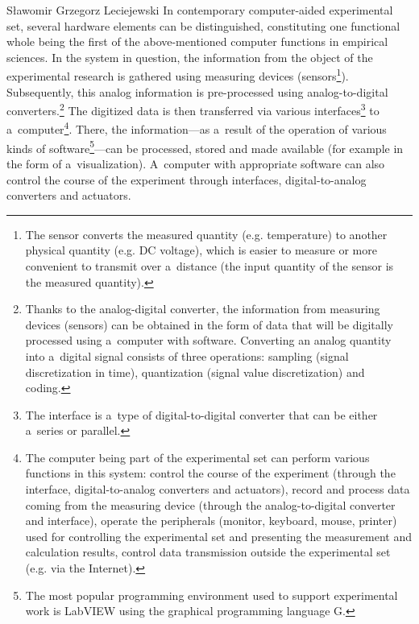 \begin{artengenv}{Sławomir Grzegorz Leciejewski}
In contemporary computer-aided experimental set, several hardware elements can be distinguished, constituting one functional whole being the first of the above-mentioned computer functions in empirical sciences. In the system in question, the information from the object of the experimental research is gathered using measuring devices (sensors\footnote{The sensor converts the measured quantity (e.g. temperature) to another physical quantity (e.g. DC voltage), which is easier to measure or more convenient to transmit over a~distance (the input quantity of the sensor is the measured quantity).}). Subsequently, this analog information is pre-processed using analog-to-digital converters.\footnote{Thanks to the analog-digital converter, the information from measuring devices (sensors) can be obtained in the form of data that will be digitally processed using a~computer with software. Converting an analog quantity into a~digital signal consists of three operations: sampling (signal discretization in time), quantization (signal value discretization) and coding.} The digitized data is then transferred via various interfaces\footnote{The interface is a~type of digital-to-digital converter that can be either a~series or parallel.} to a~computer\footnote{The computer being part of the experimental set can perform various functions in this system: control the course of the experiment (through the interface, digital-to-analog converters and actuators), record and process data coming from the measuring device (through the analog-to-digital converter and interface), operate the peripherals (monitor, keyboard, mouse, printer) used for controlling the experimental set and presenting the measurement and calculation results, control data transmission outside the experimental set (e.g. via the Internet). }. There, the information---as a~result of the operation of various kinds of software\footnote{The most popular programming environment used to support experimental work is LabVIEW using the graphical programming language G.}---can be processed, stored and made available (for example in the form of a~visualization). A~computer with appropriate software can also control the course of the experiment through interfaces, digital-to-analog converters and actuators.




\end{artengenv}
